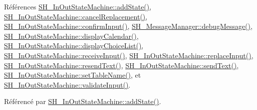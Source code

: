 Références \hyperlink{classSH__InOutStateMachine_a3de9dedcdfd6efab868484c047638f71}{S\-H\-\_\-\-In\-Out\-State\-Machine\-::add\-State()}, \hyperlink{classSH__InOutStateMachine_a035d37535533d4805fe2606f38c19380}{S\-H\-\_\-\-In\-Out\-State\-Machine\-::cancel\-Replacement()}, \hyperlink{classSH__InOutStateMachine_a7f7d9c9300c1d05bce2c26029f28cc31}{S\-H\-\_\-\-In\-Out\-State\-Machine\-::confirm\-Input()}, \hyperlink{classSH__MessageManager_a379f2aa0a590a5add34dbe91f98b2ff7}{S\-H\-\_\-\-Message\-Manager\-::debug\-Message()}, \hyperlink{classSH__InOutStateMachine_ab3a12d1f9b658d8ffdc17669a6c065f2}{S\-H\-\_\-\-In\-Out\-State\-Machine\-::display\-Calendar()}, \hyperlink{classSH__InOutStateMachine_ab74b981b0aab09067d7479f2b7e79b0b}{S\-H\-\_\-\-In\-Out\-State\-Machine\-::display\-Choice\-List()}, \hyperlink{classSH__InOutStateMachine_a037ed5e13ecfae2123a8d4940292e410}{S\-H\-\_\-\-In\-Out\-State\-Machine\-::receive\-Input()}, \hyperlink{classSH__InOutStateMachine_a9fa5db44086de2576c812f631aa4f60a}{S\-H\-\_\-\-In\-Out\-State\-Machine\-::replace\-Input()}, \hyperlink{classSH__InOutStateMachine_a526822c66b46aa0cd81ba4473fa5573f}{S\-H\-\_\-\-In\-Out\-State\-Machine\-::resend\-Text()}, \hyperlink{classSH__InOutStateMachine_a5e7f5958bae31696b6a8deab94ad2b4f}{S\-H\-\_\-\-In\-Out\-State\-Machine\-::send\-Text()}, \hyperlink{classSH__InOutStateMachine_a95db31a7e7f31f36a8737adc739ab08c}{S\-H\-\_\-\-In\-Out\-State\-Machine\-::set\-Table\-Name()}, et \hyperlink{classSH__InOutStateMachine_aec1b3fef3c1f82499aa1f73beaecd08a}{S\-H\-\_\-\-In\-Out\-State\-Machine\-::validate\-Input()}.



Référencé par \hyperlink{classSH__InOutStateMachine_adcd6eb72b60b2c24aa6701977b5c7c1e}{S\-H\-\_\-\-In\-Out\-State\-Machine\-::add\-State()}.


